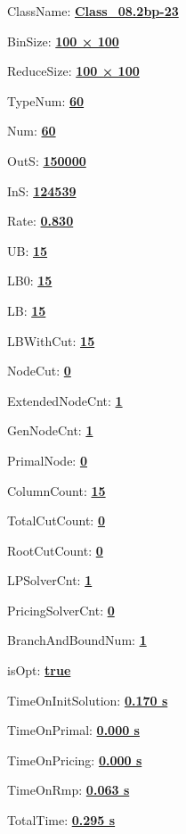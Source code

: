 \documentclass[11pt]{article}
\begin{document}
\pagestyle{empty}


ClassName: \underline{\textbf{Class_08.2bp-23}}
\par
BinSize: \underline{\textbf{100 × 100}}
\par
ReduceSize: \underline{\textbf{100 × 100}}
\par
TypeNum: \underline{\textbf{60}}
\par
Num: \underline{\textbf{60}}
\par
OutS: \underline{\textbf{150000}}
\par
InS: \underline{\textbf{124539}}
\par
Rate: \underline{\textbf{0.830}}
\par
UB: \underline{\textbf{15}}
\par
LB0: \underline{\textbf{15}}
\par
LB: \underline{\textbf{15}}
\par
LBWithCut: \underline{\textbf{15}}
\par
NodeCut: \underline{\textbf{0}}
\par
ExtendedNodeCnt: \underline{\textbf{1}}
\par
GenNodeCnt: \underline{\textbf{1}}
\par
PrimalNode: \underline{\textbf{0}}
\par
ColumnCount: \underline{\textbf{15}}
\par
TotalCutCount: \underline{\textbf{0}}
\par
RootCutCount: \underline{\textbf{0}}
\par
LPSolverCnt: \underline{\textbf{1}}
\par
PricingSolverCnt: \underline{\textbf{0}}
\par
BranchAndBoundNum: \underline{\textbf{1}}
\par
isOpt: \underline{\textbf{true}}
\par
TimeOnInitSolution: \underline{\textbf{0.170 s}}
\par
TimeOnPrimal: \underline{\textbf{0.000 s}}
\par
TimeOnPricing: \underline{\textbf{0.000 s}}
\par
TimeOnRmp: \underline{\textbf{0.063 s}}
\par
TotalTime: \underline{\textbf{0.295 s}}
\par
\newpage


\end{document}
